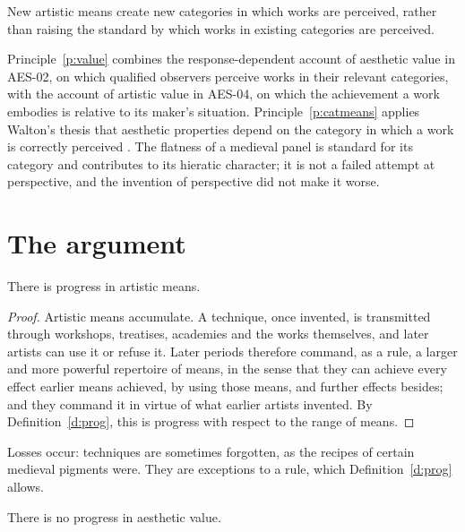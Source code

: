 \documentclass{situationist-preprint}
\begin{document}
\begin{principle}\label{p:catmeans}
New artistic means create new categories in which works are perceived, rather than raising the standard by which works in existing categories are perceived.
\end{principle}

Principle~\ref{p:value} combines the response-dependent account of aesthetic value in AES-02, on which qualified observers perceive works in their relevant categories, with the account of artistic value in AES-04, on which the achievement a work embodies is relative to its maker's situation. Principle~\ref{p:catmeans} applies Walton's thesis that aesthetic properties depend on the category in which a work is correctly perceived \citep{Walton1970}. The flatness of a medieval panel is standard for its category and contributes to its hieratic character; it is not a failed attempt at perspective, and the invention of perspective did not make it worse.

\section{The argument}

\begin{lemma}\label{l:means}
There is progress in artistic means.
\end{lemma}

\begin{proof}
Artistic means accumulate. A technique, once invented, is transmitted through workshops, treatises, academies and the works themselves, and later artists can use it or refuse it. Later periods therefore command, as a rule, a larger and more powerful repertoire of means, in the sense that they can achieve every effect earlier means achieved, by using those means, and further effects besides; and they command it in virtue of what earlier artists invented. By Definition~\ref{d:prog}, this is progress with respect to the range of means.
\end{proof}

Losses occur: techniques are sometimes forgotten, as the recipes of certain medieval pigments were. They are exceptions to a rule, which Definition~\ref{d:prog} allows.

\begin{lemma}\label{l:aes}
There is no progress in aesthetic value.
\end{lemma}
\end{document}
